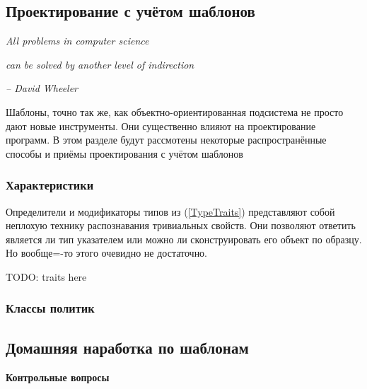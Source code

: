 \documentclass[a4paper,12pt,oneside]{article}
\begin{document}
\subsection{Проектирование с учётом шаблонов}

\pagebreak
\hfill\textit{All problems in computer science}

\hfill\textit{can be solved by another level of indirection}{\vspace{0.5em}}

\hfill\textit{-- David Wheeler}

Шаблоны, точно так же, как объектно-ориентированная подсистема не просто дают новые инструменты. Они существенно влияют на проектирование программ. В этом разделе будут рассмотены некоторые распространённые способы и приёмы проектирования с учётом шаблонов

\subsubsection{Характеристики}\label{subsub:traits}

Определители и модификаторы типов из (\ref{TypeTraits}) представляют собой неплохую технику распознавания тривиальных свойств. Они позволяют ответить является ли тип указателем или можно ли сконструировать его объект по образцу. Но вообще=-то этого очевидно не достаточно.

TODO: traits here

\subsubsection{Классы политик}\label{subsub:policy}

\pagebreak
\subsection{Домашняя наработка по шаблонам}

\textbf{Контрольные вопросы}
\end{document}
